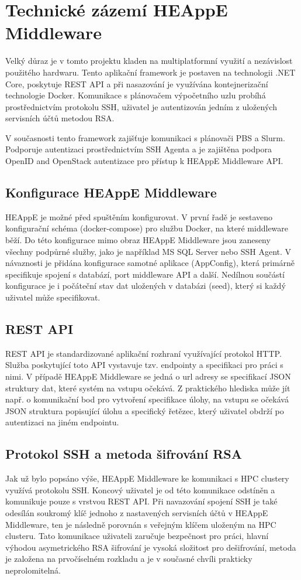 \newpage
\section{Technické zázemí HEAppE Middleware}
Velký důraz je v tomto projektu kladen na multiplatformní využití a nezávislost použitého hardwaru. Tento aplikační framework je postaven na technologii .NET Core, poskytuje REST API a při nasazování je využívána kontejnerizační technologie Docker. Komunikace s plánovačem výpočetního uzlu probíhá prostřednictvím protokolu SSH, uživatel je autentizován jedním z uložených servisních účtů metodou RSA.

V současnosti tento framework zajišťuje komunikaci s plánovači PBS a Slurm. Podporuje autentizaci prostřednictvím SSH Agenta a je zajištěna podpora OpenID and OpenStack autentizace pro přístup k HEAppE Middleware API.

\subsection{Konfigurace HEAppE Middleware}
HEAppE je možné před spuštěním konfigurovat. V první řadě je sestaveno konfigurační schéma (docker-compose) pro službu Docker, na které middleware běží. Do této konfigurace mimo obraz HEAppE Middleware jsou zaneseny všechny podpůrné služby, jako je například MS SQL Server nebo SSH Agent. V návaznosti je přidána konfigurace samotné aplikace (AppConfig), která primárně specifikuje spojení s databází, port middleware API a další. Nedílnou součástí konfigurace je i počáteční stav dat uložených v databázi (seed), který si každý uživatel může specifikovat.

\subsection{REST API}
REST API je standardizované aplikační rozhraní využívající protokol HTTP. Služba poskytující toto API vystavuje tzv. endpointy a specifikaci pro práci s nimi. V případě HEAppE Middleware se jedná o url adresy se specifikací JSON struktury dat, které systém na vstupu očekává. Z praktického hlediska může jít např. o komunikační bod pro vytvoření specifikace úlohy, na vstupu se očekává JSON struktura popisující úlohu a specifický řetězec, který uživatel obdrží po autentizaci na jiném endpointu.

\subsection{Protokol SSH a metoda šifrování RSA}
Jak už bylo popsáno výše, HEAppE Middleware ke komunikaci s HPC clustery využívá protokolu SSH. Koncový uživatel je od této komunikace odstíněn a komunikuje pouze s vrstvou REST API. Při navazování spojení SSH je také odesílán soukromý klíč jednoho z nastavených servisních účtů v HEAppE Middleware, ten je následně porovnán s veřejným klíčem uloženým na HPC clusteru. Tato komunikace uživateli zaručuje bezpečnost pro práci, hlavní výhodou asymetrického RSA šifrování je vysoká složitost pro dešifrování, metoda je založena na prvočíselném rozkladu a je v současné chvíli prakticky neprolomitelná.

